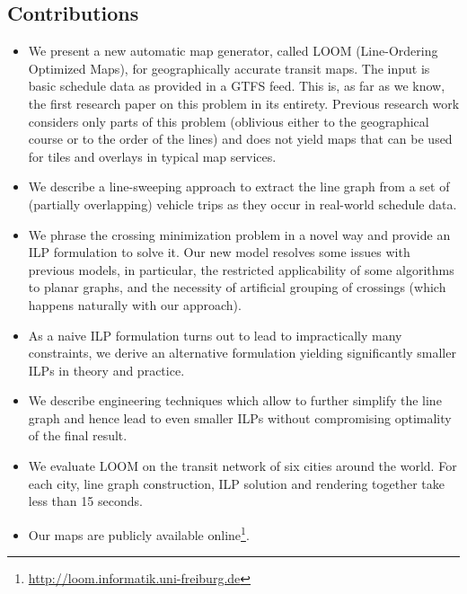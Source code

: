 \documentclass[sigconf]{acmart}
\begin{document}
\subsection{Contributions}\label{SEC:intro:contrib}
\begin{itemize}[topsep=0pt, parsep=0.5mm,leftmargin=0mm,itemindent=4mm,itemsep=-1pt]
\renewcommand\labelitemi{$\bullet$}
\item We present a new automatic map generator, called LOOM (Line-Ordering Optimized Maps), for geographically accurate transit maps. The input is basic schedule data as provided in a GTFS feed.
 This is, as far as we know, the first research paper on this problem in its entirety. Previous research work considers only parts of this problem (oblivious either to the geographical course or to the order of the lines) and does not yield maps that can be used for tiles and overlays in typical map services.

\item We describe a line-sweeping approach to extract the line graph from a set of (partially overlapping) vehicle trips as they occur in real-world schedule data.
\item We phrase the crossing minimization problem in a novel way and provide an ILP formulation to solve it. Our new model resolves some issues with previous models, in particular, the restricted applicability of some algorithms to planar graphs, and the necessity of artificial grouping of crossings (which happens naturally with our approach).

\item As a naive ILP formulation turns out to lead to impractically many constraints, we derive an alternative formulation yielding significantly smaller ILPs in theory and practice.

\item We describe engineering techniques which allow to further simplify the line graph and hence lead to even smaller ILPs without compromising optimality of the final result.

\item We evaluate LOOM on the transit network of six cities around the world.
For each city, line graph construction, ILP solution and rendering together take less than 15 seconds.

\item Our maps are publicly available online\footnote{\url{http://loom.informatik.uni-freiburg.de}}.
\end{itemize}
\end{document}
